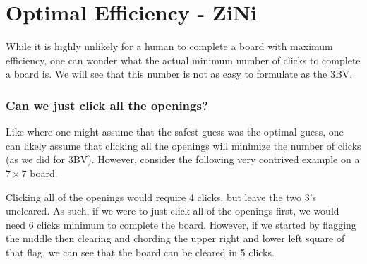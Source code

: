 \section{Optimal Efficiency - ZiNi}

While it is highly unlikely for a human to complete a board with maximum efficiency, one can wonder what the actual minimum number of clicks to complete a board is. We will see that this number is not as easy to formulate as the 3BV. 

\subsubsection*{Can we just click all the openings?}

Like where one might assume that the safest guess was the optimal guess, one can likely assume that clicking all the openings will minimize the number of clicks (as we did for 3BV). However, consider the following very contrived example on a $7\times7$ board.

\begin{center}
    \begin{minipage}{0.25\linewidth}\centering\resizebox{1\linewidth}{!}{\begin{minesweeperboard}
        \cellflag \& \cellflag \& \celltwo \& \cellzero \& \cellone \& \cellflag \& \cellflag\\
        \cellflag \& \cellflag \& \celltwo \& \cellzero \& \cellone \& \cellthree \& \cellflag\\
        \celltwo \& \celltwo \& \celltwo \& \cellone \& \cellone \& \cellone \& \cellone\\
        \cellzero \& \cellzero \& \cellone \& \cellflag \& \cellone \& \cellzero \& \cellzero\\
        \cellone \& \cellone \& \cellone \& \cellone \& \celltwo \& \celltwo \& \celltwo\\
        \cellflag \& \cellthree \& \cellone \& \cellzero \& \celltwo \& \cellflag \& \cellflag\\
        \cellflag \& \cellflag \& \cellone \& \cellzero \& \celltwo \& \cellflag \& \cellflag\\
    \end{minesweeperboard}}\end{minipage}
\end{center}

Clicking all of the openings would require 4 clicks, but leave the two 3's uncleared. As such, if we were to just click all of the openings first, we would need 6 clicks minimum to complete the board. However, if we started by flagging the middle then clearing and chording the upper right and lower left square of that flag, we can see that the board can be cleared in 5 clicks.\\

